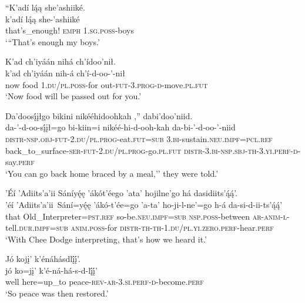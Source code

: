 \ea\label{ex:text1-70-1}
``K’adí lą́ą she’ashiiké.\\
\gll k’adí	lą́ą	she-’ashiiké\\
     that's\_enough!	\textsc{emph}	1.\textsc{sg}.\textsc{poss}-boys\\
\glt `{``}That's enough my boys.'
\z

\ea\label{ex:text1-70-2}
K’ad ch’iyáán nihá ch’ídoo’nił.\\
\gll k’ad	ch’iyáán	nih-á	ch’í-d-oo-’-nił\\
     now	food	1.\textsc{du}/\textsc{pl}.\textsc{poss}-for	out-\textsc{fut}-3.\textsc{prog}-\textsc{d}-move.\textsc{pl}.\textsc{fut}\\
\glt `Now food will be passed out for you.'
\z

\ea\label{ex:text1-70-3}
Da’doosį́įłgo bikini nikééhidoohkah ,'' dabi’doo’niid.\\
\gll da-’-d-oo-sį́įł=go	bi-kiin=i	nikéé-hi-d-ooh-kah	da-bi-’-d-oo-’-niid\\
     \textsc{distr}-\textsc{nsp}.\textsc{obj}-\textsc{fut}-2.\textsc{du}/\textsc{pl}.\textsc{prog}-eat.\textsc{fut}=\textsc{sub}	3.\textsc{bi}-sustain.\textsc{neu}.\textsc{impf}=\textsc{pcl}.\textsc{ref}	back\_to\_surface-\textsc{ser}-\textsc{fut}-2.\textsc{du}/\textsc{pl}.\textsc{prog}-go.\textsc{pl}.\textsc{fut}	\textsc{distr}-3.\textsc{bi}-\textsc{nsp}.\textsc{sbj}-\textsc{th}-3.\textsc{yi}.\textsc{perf}-\textsc{d}-say.\textsc{perf}\\
\glt `You can go back home braced by a meal,'' they were told.'
\z

\ea\label{ex:text1-71-1}
’Éí ’Adiits’a’ii Sáníyę́ę ’ákót’éego ’ata’ hojilne’go há dasidiits’ą́ą́’.\\
\gll ’éí	’Adiits’a’ii~{Sání=yę́ę}	’ákó-t’ée=go	’a-ta’	ho-ji-l-ne’=go	h-á	da-si-d-ii-ts’ą́ą́’\\
     that	Old\_Interpreter=\textsc{pst}.\textsc{ref}	so-be.\textsc{neu}.\textsc{impf}=\textsc{sub}	\textsc{nsp}.\textsc{poss}-between	\textsc{ar}-\textsc{anim}-\textsc{l}-tell.\textsc{dur}.\textsc{impf}=\textsc{sub}	\textsc{anim}.\textsc{poss}-for	\textsc{distr}-\textsc{th}-\textsc{th}-1.\textsc{du}/\textsc{pl}.\textsc{yi}.\textsc{zero}.\textsc{perf}-hear.\textsc{perf}\\
\glt `With Chee Dodge interpreting, that's how we heard it.'
\z

\ea\label{ex:text1-71-2}
Jó kojį’ k’énáhásdlį́į́’.\\
\gll jó	ko=jį’	k’é-ná-há-s-d-lį́į́’\\
     well	here=up\_to	peace-\textsc{rev}-\textsc{ar}-3.\textsc{si}.\textsc{perf}-\textsc{d}-become.\textsc{perf}\\
\glt `So peace was then restored.'
\z

